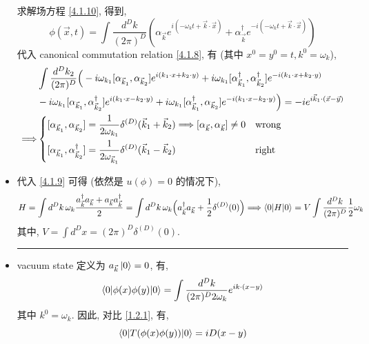 \begin{itemize}
	\begin{tcolorbox}[title=calculation:]
		求解场方程 \eqref{4.1.10}, 得到,
		\begin{equation}
			\phi(\vec{x}, t) = \int \frac{d^D k}{(2 \pi)^D} (\alpha_{\vec{k}} e^{i (- \omega_k t + \vec{k} \cdot \vec{x})} + \alpha^\dag_{\vec{k}} e^{- i (- \omega_k t + \vec{k} \cdot \vec{x})})
		\end{equation}
		代入 canonical commutation relation \eqref{4.1.8}, 有 (其中 $x^0 = y^0 = t, k^0 = \omega_k$),
		\begin{align}
			& \int \frac{d^D k_2}{(2 \pi)^D} \Big( - i \omega_{k_1} [\alpha_{\vec{k}_1}, \alpha_{\vec{k}_2}] e^{i (k_1 \cdot x + k_2 \cdot y)} + i \omega_{k_1} [\alpha^\dag_{\vec{k}_1}, \alpha^\dag_{\vec{k}_2}] e^{- i (k_1 \cdot x + k_2 \cdot y)} \notag \\
			& - i \omega_{k_1} [\alpha_{\vec{k}_1}, \alpha^\dag_{\vec{k}_2}] e^{i (k_1 \cdot x - k_2 \cdot y)} + i \omega_{k_1} [\alpha^\dag_{\vec{k}_1}, \alpha_{\vec{k}_2}] e^{- i (k_1 \cdot x - k_2 \cdot y)} \Big) = - i e^{i \vec{k}_1 \cdot (\vec{x} - \vec{y})} \notag \\
			\Longrightarrow & \begin{dcases}
				[\alpha_{\vec{k}_1}, \alpha_{\vec{k}_2}] = \frac{1}{2 \omega_{k_1}} \delta^{(D)}(\vec{k}_1 + \vec{k}_2) \Longrightarrow [\alpha_{\vec{k}}, \alpha_{\vec{k}}] \neq 0 & \text{wrong} \\
				[\alpha_{\vec{k}_1}, \alpha^\dag_{\vec{k}_2}] = \frac{1}{2 \omega_{\vec{k}_1}} \delta^{(D)}(\vec{k}_1 - \vec{k}_2) & \text{right}
			\end{dcases}
		\end{align}
	\end{tcolorbox}
	
	\item 代入 \eqref{4.1.9} 可得 (依然是 $u(\phi) = 0$ 的情况下),
	\begin{equation} \label{4.1.15}
		H = \int d^D k \, \omega_k \frac{a^\dag_{\vec{k}} a_{\vec{k}} + a_{\vec{k}} a^\dag_{\vec{k}}}{2} = \int d^D k \, \omega_k \Big( a^\dag_{\vec{k}} a_{\vec{k}} + \frac{1}{2} \delta^{(D)}(0) \Big) \Longrightarrow \braket{0 | H | 0} = V \int \frac{d^D k}{(2 \pi)^D} \frac{1}{2} \omega_k
	\end{equation}
	其中, $V = \int d^D x = (2 \pi)^D \delta^{(D)}(0)$.
	
	\noindent\rule[0.5ex]{\linewidth}{0.5pt} %
	
	\item vacuum state 定义为 $a_{\vec{k}} \ket{0} = 0$, 有,
	\begin{equation}
		\braket{0 | \phi(x) \phi(y) | 0} = \int \frac{d^D k}{(2 \pi)^D 2 \omega_k} e^{i k \cdot (x - y)}
	\end{equation}
	其中 $k^0 = \omega_k$. 因此, 对比 \eqref{1.2.1}, 有,
	\begin{equation} \label{4.1.17}
		\braket{0 | T(\phi(x) \phi(y)) | 0} = i D(x - y)
	\end{equation}
\end{itemize}

